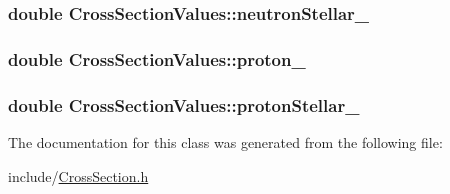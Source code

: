 \hypertarget{classCrossSectionValues_a98880642976f3151a1db303a844f6ea5}{
\subsubsection[{neutron\-Stellar\-\_\-}]{\setlength{\rightskip}{0pt plus 5cm}double Cross\-Section\-Values\-::neutron\-Stellar\-\_\-}}\label{classCrossSectionValues_a98880642976f3151a1db303a844f6ea5}
\hypertarget{classCrossSectionValues_a67b8cc02e343363b59fbd03c453f3414}{
\subsubsection[{proton\-\_\-}]{\setlength{\rightskip}{0pt plus 5cm}double Cross\-Section\-Values\-::proton\-\_\-}}\label{classCrossSectionValues_a67b8cc02e343363b59fbd03c453f3414}
\hypertarget{classCrossSectionValues_a397ce725fd6c8f5f3c92422a811a79fd}{
\subsubsection[{proton\-Stellar\-\_\-}]{\setlength{\rightskip}{0pt plus 5cm}double Cross\-Section\-Values\-::proton\-Stellar\-\_\-}}\label{classCrossSectionValues_a397ce725fd6c8f5f3c92422a811a79fd}


The documentation for this class was generated from the following file\-:\begin{DoxyCompactItemize}
\item 
include/\hyperlink{CrossSection_8h}{Cross\-Section.\-h}\end{DoxyCompactItemize}
